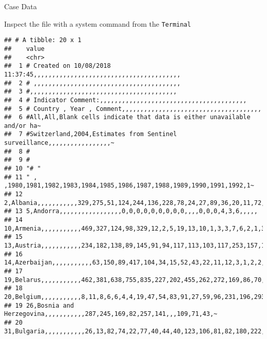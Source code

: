 \documentclass[ignorenonframetext,]{beamer}
\newenvironment{Shaded}{\begin{snugshade}}{\end{snugshade}}
\newcommand{\DataTypeTok}[1]{\textcolor[rgb]{0.13,0.29,0.53}{#1}}
\newcommand{\DecValTok}[1]{\textcolor[rgb]{0.00,0.00,0.81}{#1}}
\newcommand{\KeywordTok}[1]{\textcolor[rgb]{0.13,0.29,0.53}{\textbf{#1}}}
\newcommand{\NormalTok}[1]{#1}
\newcommand{\OperatorTok}[1]{\textcolor[rgb]{0.81,0.36,0.00}{\textbf{#1}}}
\newcommand{\OtherTok}[1]{\textcolor[rgb]{0.56,0.35,0.01}{#1}}
\newcommand{\StringTok}[1]{\textcolor[rgb]{0.31,0.60,0.02}{#1}}
\begin{document}
\begin{frame}[fragile]
\begin{block}{Case Data}
\end{block}

\begin{block}{Inspect the file with a system command from the
\texttt{Terminal}}

\begin{Shaded}
\end{Shaded}

\begin{verbatim}
## # A tibble: 20 x 1
##    value                                                                   
##    <chr>                                                                   
##  1 # Created on 10/08/2018 11:37:45,,,,,,,,,,,,,,,,,,,,,,,,,,,,,,,,,,,,,,,,
##  2 # ,,,,,,,,,,,,,,,,,,,,,,,,,,,,,,,,,,,,,,,,                              
##  3 #,,,,,,,,,,,,,,,,,,,,,,,,,,,,,,,,,,,,,,,,                               
##  4 # Indicator Comment:,,,,,,,,,,,,,,,,,,,,,,,,,,,,,,,,,,,,,,,,            
##  5 # Country , Year , Comment,,,,,,,,,,,,,,,,,,,,,,,,,,,,,,,,,,,,,,        
##  6 #All,All,Blank cells indicate that data is either unavailable and/or ha~
##  7 #Switzerland,2004,Estimates from Sentinel surveillance,,,,,,,,,,,,,,,,,~
##  8 #                                                                       
##  9 #                                                                       
## 10 "# "                                                                    
## 11 " , ,1980,1981,1982,1983,1984,1985,1986,1987,1988,1989,1990,1991,1992,1~
## 12 2,Albania,,,,,,,,,,,329,275,51,124,244,136,228,78,24,27,89,36,20,11,72,~
## 13 5,Andorra,,,,,,,,,,,,,,,,,0,0,0,0,0,0,0,0,0,,,,0,0,0,4,3,6,,,,,         
## 14 10,Armenia,,,,,,,,,,,469,327,124,98,329,12,2,5,19,13,10,1,3,3,7,6,2,1,3~
## 15 13,Austria,,,,,,,,,,,234,182,138,89,145,91,94,117,113,103,117,253,157,1~
## 16 14,Azerbaijan,,,,,,,,,,,63,150,89,417,104,34,15,52,43,22,11,12,3,1,2,2,~
## 17 19,Belarus,,,,,,,,,,,462,381,638,755,835,227,202,455,262,272,169,86,70,~
## 18 20,Belgium,,,,,,,,,,,8,11,8,6,6,4,4,19,47,54,83,91,27,59,96,231,196,293~
## 19 26,Bosnia and Herzegovina,,,,,,,,,,,287,245,169,82,257,141,,,109,71,43,~
## 20 31,Bulgaria,,,,,,,,,,,26,13,82,74,22,77,40,44,40,123,106,81,82,180,222,~
\end{verbatim}


\end{block}
\end{frame}
\end{document}
